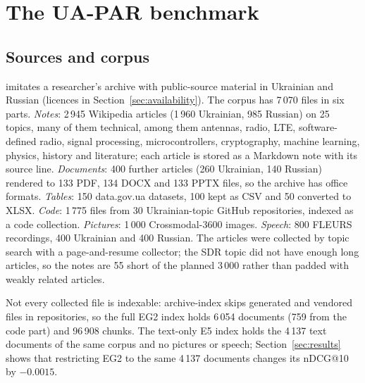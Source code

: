\section{The UA-PAR benchmark}\label{sec:uapar}

\subsection{Sources and corpus}
\uapar{} imitates a researcher's archive with public-source material in Ukrainian and Russian (licences in Section~\ref{sec:availability}). The corpus has 7\,070 files in six parts. \emph{Notes}: 2\,945 Wikipedia articles (1\,960 Ukrainian, 985 Russian) on 25 topics, many of them technical, among them antennas, radio, LTE, software-defined radio, signal processing, microcontrollers, cryptography, machine learning, physics, history and literature; each article is stored as a Markdown note with its source line. \emph{Documents}: 400 further articles (260 Ukrainian, 140 Russian) rendered to 133 PDF, 134 DOCX and 133 PPTX files, so the archive has office formats. \emph{Tables}: 150 data.gov.ua datasets, 100 kept as CSV and 50 converted to XLSX. \emph{Code}: 1\,775 files from 30 Ukrainian-topic GitHub repositories, indexed as a code collection. \emph{Pictures}: 1\,000 Crossmodal-3600 images. \emph{Speech}: 800 FLEURS recordings, 400 Ukrainian and 400 Russian. The articles were collected by topic search with a page-and-resume collector; the SDR topic did not have enough long articles, so the notes are 55 short of the planned 3\,000 rather than padded with weakly related articles.

Not every collected file is indexable: archive-index skips generated and vendored files in repositories, so the full EG2 index holds 6\,054 documents (759 from the code part) and 96\,908 chunks. The text-only E5 index holds the 4\,137 text documents of the same corpus and no pictures or speech; Section~\ref{sec:results} shows that restricting EG2 to the same 4\,137 documents changes its nDCG@10 by $-0.0015$.

